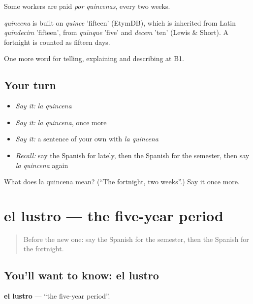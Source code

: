 Some workers are paid \emph{por quincenas}, every two weeks.

\begin{cousinweb}
\emph{quincena} is built on \emph{quince} 'fifteen' (EtymDB), which is inherited from Latin \emph{quīndecim} 'fifteen', from \emph{quīnque} 'five' and \emph{decem} 'ten' (Lewis \& Short). A fortnight is counted as fifteen days.
\end{cousinweb}

\begin{grammarlens}[title={What you've built}]
One more word for telling, explaining and describing at B1.
\end{grammarlens}

\subsection*{Your turn}
\begin{itemize}
\raggedright
  \item \emph{Say it:} \emph{la quincena}
  \item \emph{Say it:} \emph{la quincena}, once more
  \item \emph{Say it:} a sentence of your own with \emph{la quincena}
  \item \emph{Recall:} say the Spanish for lately, then the Spanish for the semester, then say \emph{la quincena} again
\end{itemize}

\begin{tcolorbox}[breakable,colback=teal!4,colframe=teal!35!black,title={Before you move on}]
What does la quincena mean? (\textquotedblleft{}The fortnight, two weeks\textquotedblright{}.) Say it once more.
\end{tcolorbox}
\section[el lustro]{el lustro — the five-year period}

\label{lesson:ES-C539-lustro}



\begin{quote}
Before the new one: say the Spanish for the semester, then the Spanish for the fortnight.
\end{quote}

\subsection*{You'll want to know: el lustro}
\textbf{el lustro} — \textquotedblleft{}the five-year period\textquotedblright{}.

